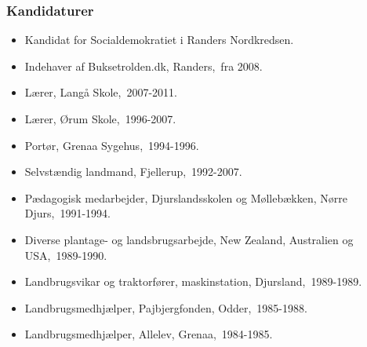 \documentclass[11pt, a4paper]{awesome-cv}
\begin{document}
\begin{cvletter}
\subsubsection*{Kandidaturer}
\begin{itemize}
\item Kandidat for Socialdemokratiet i Randers Nordkredsen.
\end{itemize}
\begin{itemize}
\item Indehaver af Buksetrolden.dk, Randers, fra 2008.
\item Lærer, Langå Skole, 2007-2011.
\item Lærer, Ørum Skole, 1996-2007.
\item Portør, Grenaa Sygehus, 1994-1996.
\item Selvstændig landmand, Fjellerup, 1992-2007.
\item Pædagogisk medarbejder, Djurslandsskolen og Møllebækken, Nørre Djurs, 1991-1994.
\item Diverse plantage- og landsbrugsarbejde, New Zealand, Australien og USA, 1989-1990.
\item Landbrugsvikar og traktorfører, maskinstation, Djursland, 1989-1989.
\item Landbrugsmedhjælper, Pajbjergfonden, Odder, 1985-1988.
\item Landbrugsmedhjælper, Allelev, Grenaa, 1984-1985.
\end{itemize}
\end{cvletter}
\end{document}
